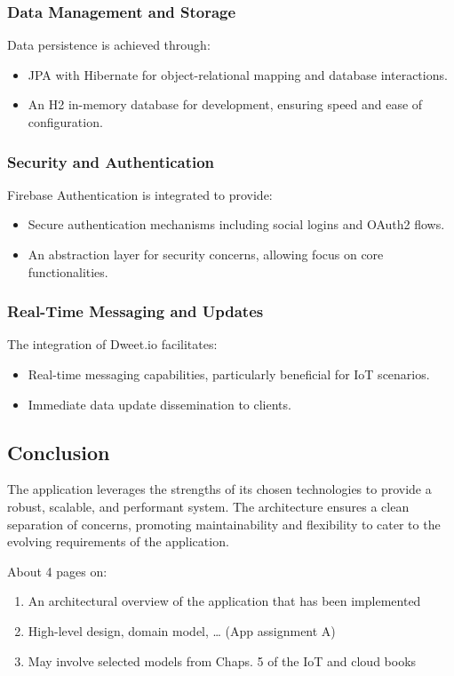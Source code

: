 \subsubsection{Data Management and Storage}
Data persistence is achieved through:
\begin{itemize}
  \item JPA with Hibernate for object-relational mapping and database interactions.
  \item An H2 in-memory database for development, ensuring speed and ease of configuration.
\end{itemize}

\subsubsection{Security and Authentication}
Firebase Authentication is integrated to provide:
\begin{itemize}
  \item Secure authentication mechanisms including social logins and OAuth2 flows.
  \item An abstraction layer for security concerns, allowing focus on core functionalities.
\end{itemize}

\subsubsection{Real-Time Messaging and Updates}
The integration of Dweet.io facilitates:
\begin{itemize}
  \item Real-time messaging capabilities, particularly beneficial for IoT scenarios.
  \item Immediate data update dissemination to clients.
\end{itemize}

\subsection{Conclusion}
The application leverages the strengths of its chosen technologies to provide a robust, scalable, and performant system. The architecture ensures a clean separation of concerns, promoting maintainability and flexibility to cater to the evolving requirements of the application.


About 4 pages on:

\begin{enumerate}

\item An architectural overview of the application that has been implemented
\item High-level design, domain model, … (App assignment A)
\item May involve selected models from Chaps. 5 of the IoT and cloud books


\end{enumerate}

